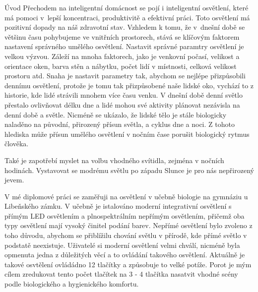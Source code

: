 \chap Úvod
Přechodem na inteligentní domácnost se pojí i inteligentní osvětlení, které má pomoci v~lepší koncentraci, produktivitě a efektivní práci. Toto osvětlení má pozitivní dopady
na náš zdravotní stav. Vzhledem k tomu, že v~dnešní době se většinu času pohybujeme ve vnitřních prostorech, stává se klíčovým faktorem nastavení správného umělého osvětlení.
Nastavit správné paramtry osvětlení je velkou výzvou. Záleží na mnoha faktorech, jako je venkovní počasí, velikost a orientace oken, barva stěn a nábytku, počet lidí v místnosti,
celková velikost prostoru atd. Snaha je nastavit parametry tak, abychom se nejlépe přizpůsobili
dennímu osvětlení, protože je tomu tak přizpůsobené naše lidské oko, vychází to z historie, kde lidé strávili mnohem více času venku. V dnešní době denní světlo přestalo ovlivňovat délku
dne a lidé mohou své aktivity plánovat nezávisla na denní době a světle. Nicméně se ukázalo, že lidské tělo je stále
biologicky naladěno na původní, přirozený přísun světla, a cyklus dne a noci. Z tohoto
hlediska může přísun umělého osvětlení v nočním čase porušit biologický rytmus
člověka.

\medskip
Také je zapotřebí myslet na volbu vhodného svítidla, zejména v nočních hodinách. Vystavovat se modrému světlu po západu Slunce je pro nás nepřirozený jevem.

\medskip
V mé diplomové práci se zaměřuji na osvětlení v učebně biologie na gymnáziu u Libeňského zámku. V učebně je istalováno moderní integrativní osvětlení s přímým LED osvětlením a
plnospektrálním nepřímým osvětlením, přičemž oba typy osvětlení mají vysoký činitel podání barev. Nepřímé osvětlení bylo zvoleno z toho důvodu, abychom se přiblížilu chování světlu
v přírodě, kde přímé světlo v podstatě neexistuje. Uživatelé si moderní osvětlení velmi chválí, nicméně byla opmenuta jedna z důležitých věcí a to ovládání takového osvětlení.
Aktuálně je takové osvtělení ovládádno 12 tlačítky a způsobuje to velké potíže. Porot je mým cílem zredukovat tento počet tlačítek na 3 - 4 tlačítka nasatvit vhodné scény podle biologického
a hygienického komfortu.



